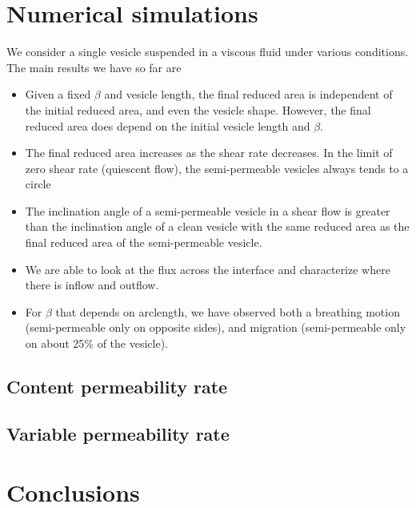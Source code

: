 \documentclass[twoside,twocolumn,9pt]{article}
\begin{document}
\section{Numerical simulations}
We consider a single vesicle suspended in a viscous fluid under various
conditions.  The main results we have so far are
\begin{itemize}
  \item Given a fixed $\beta$ and vesicle length, the final reduced area
    is independent of the initial reduced area, and even the vesicle
    shape. However, the final reduced area does depend on the initial
    vesicle length and $\beta$.
    
  \item The final reduced area increases as the shear rate decreases. In
    the limit of zero shear rate (quiescent flow), the semi-permeable
    vesicles always tends to a circle

  \item The inclination angle of a semi-permeable vesicle in a shear
    flow is greater than the inclination angle of a clean vesicle with
    the same reduced area as the final reduced area of the
    semi-permeable vesicle.

  \item We are able to look at the flux across the interface and
    characterize where there is inflow and outflow.

  \item For $\beta$ that depends on arclength, we have observed both a
    breathing motion (semi-permeable only on opposite sides), and
    migration (semi-permeable only on about 25\% of the vesicle).
\end{itemize}

\subsection{Content permeability rate}


\subsection{Variable permeability rate}

\section{Conclusions}
\end{document}
